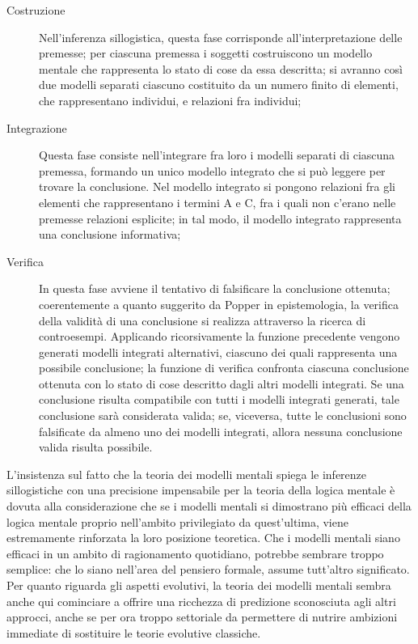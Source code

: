\begin{description}
  \item[Costruzione] Nell’inferenza sillogistica, questa fase corrisponde all’interpretazione delle premesse; per ciascuna premessa i soggetti costruiscono un modello mentale che rappresenta lo stato di cose da essa descritta; si avranno così due modelli separati ciascuno costituito da un numero finito di elementi, che rappresentano individui, e relazioni fra individui;
  \item[Integrazione] Questa fase consiste nell’integrare fra loro i modelli separati di ciascuna premessa, formando un unico modello integrato che si può leggere per trovare la conclusione. Nel modello integrato si pongono relazioni fra gli elementi che rappresentano i termini A e C, fra i quali non c’erano nelle premesse relazioni esplicite; in tal modo, il modello integrato rappresenta una conclusione informativa;
  \item[Verifica] In questa fase avviene il tentativo di falsificare la conclusione ottenuta; coerentemente a quanto suggerito da Popper in epistemologia, la verifica della validità di una conclusione si realizza attraverso la ricerca di controesempi. Applicando ricorsivamente la funzione precedente vengono generati modelli integrati alternativi, ciascuno dei quali rappresenta una possibile conclusione; la funzione di verifica confronta ciascuna conclusione ottenuta con lo stato di cose descritto dagli altri modelli integrati. Se una conclusione risulta compatibile con tutti i modelli integrati generati, tale conclusione sarà considerata valida; se, viceversa, tutte le conclusioni sono falsificate da almeno uno dei modelli integrati, allora nessuna conclusione valida risulta possibile.
\end{description}

L’insistenza sul fatto che la teoria dei modelli mentali spiega le inferenze sillogistiche con una precisione impensabile per la teoria della logica mentale è dovuta alla considerazione che se i modelli mentali si dimostrano più efficaci della logica mentale proprio nell’ambito privilegiato da quest’ultima, viene estremamente rinforzata la loro posizione teoretica. Che i modelli mentali siano efficaci in un ambito di ragionamento quotidiano, potrebbe sembrare troppo semplice: che lo siano nell’area del pensiero formale, assume tutt’altro significato. Per quanto riguarda gli aspetti evolutivi, la teoria dei modelli mentali sembra anche qui cominciare a offrire una ricchezza di predizione sconosciuta agli altri approcci, anche se per ora troppo settoriale da permettere di nutrire ambizioni immediate di sostituire le teorie evolutive classiche.